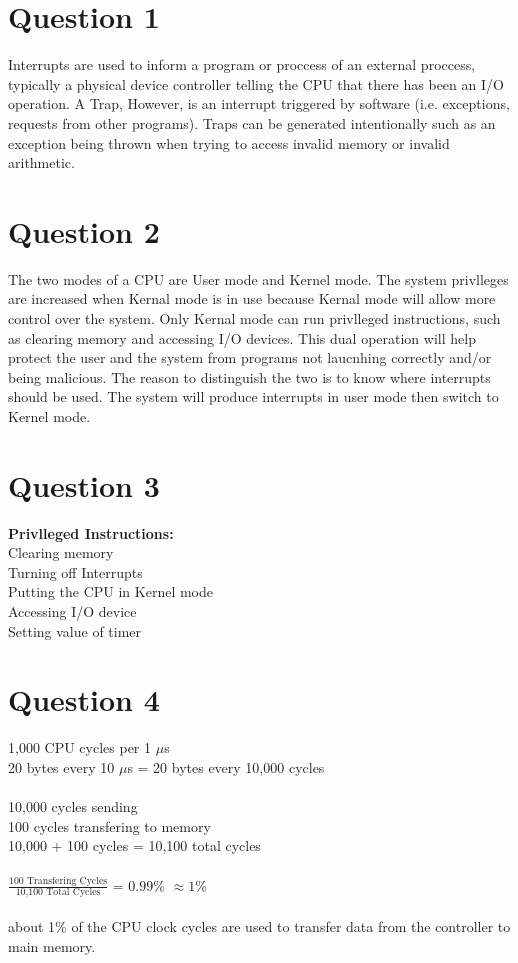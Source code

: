 \documentclass[11pt]{article}
\begin{document}
\maketitle


\section*{Question 1}
Interrupts are used to inform a program or proccess
of an external proccess, typically a physical 
device controller telling the CPU that there has 
been an I/O operation. A Trap, However, is an interrupt 
triggered by software (i.e. exceptions, requests
from other programs). Traps can be generated 
intentionally such as an exception being thrown when
trying to access invalid memory or invalid 
arithmetic.

\section*{Question 2}
The two modes of a CPU are User mode and Kernel mode.
The system privlleges are increased when Kernal mode
is in use because Kernal mode will allow more control
over the system. Only Kernal mode can run privlleged
instructions, such as clearing memory and accessing
I/O devices. This dual operation will help protect
the user and the system from programs not laucnhing 
correctly and/or being malicious. The reason to 
distinguish the two is to know where interrupts
should be used. The system will produce interrupts 
in user mode then switch to Kernel mode.

\section*{Question 3}
\textbf{Privlleged Instructions:}\\
Clearing memory\\
Turning off Interrupts\\
Putting the CPU in Kernel mode\\
Accessing I/O device\\
Setting value of timer

\section*{Question 4}
1,000 CPU cycles per 1 $\mu$s\\
20 bytes every 10 $\mu$s = 20 bytes every 10,000 cycles\\\\
10,000 cycles sending\\
100 cycles transfering to memory\\
10,000 + 100 cycles = 10,100 total cycles\\\\
\( \frac{\text{100 Transfering Cycles}}
{\text{10,100 Total Cycles}} \) = $0.99$\% $\approx 1$\%\\\\
about 1\% of the CPU clock cycles are used to 
transfer data from the controller to main memory.
\end{document}
